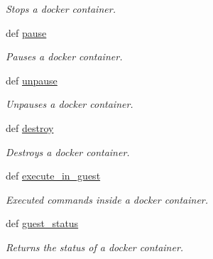 \begin{DoxyCompactItemize}
\begin{DoxyCompactList}\small\item\em Stops a docker container. \end{DoxyCompactList}\item 
\hypertarget{classhypervisor_1_1docker__driver_1_1Docker_a59333c78b7994d50b017f43e3a75d60a}{def \hyperlink{classhypervisor_1_1docker__driver_1_1Docker_a59333c78b7994d50b017f43e3a75d60a}{pause}}\label{classhypervisor_1_1docker__driver_1_1Docker_a59333c78b7994d50b017f43e3a75d60a}

\begin{DoxyCompactList}\small\item\em Pauses a docker container. \end{DoxyCompactList}\item 
\hypertarget{classhypervisor_1_1docker__driver_1_1Docker_a6bd4ee04c3dd50a06dd6dac1eb374f9b}{def \hyperlink{classhypervisor_1_1docker__driver_1_1Docker_a6bd4ee04c3dd50a06dd6dac1eb374f9b}{unpause}}\label{classhypervisor_1_1docker__driver_1_1Docker_a6bd4ee04c3dd50a06dd6dac1eb374f9b}

\begin{DoxyCompactList}\small\item\em Unpauses a docker container. \end{DoxyCompactList}\item 
\hypertarget{classhypervisor_1_1docker__driver_1_1Docker_a2ec2d8fe9b9e41e66e5939dd5440ecac}{def \hyperlink{classhypervisor_1_1docker__driver_1_1Docker_a2ec2d8fe9b9e41e66e5939dd5440ecac}{destroy}}\label{classhypervisor_1_1docker__driver_1_1Docker_a2ec2d8fe9b9e41e66e5939dd5440ecac}

\begin{DoxyCompactList}\small\item\em Destroys a docker container. \end{DoxyCompactList}\item 
\hypertarget{classhypervisor_1_1docker__driver_1_1Docker_a59d42532a812e640504eb6dad7741049}{def \hyperlink{classhypervisor_1_1docker__driver_1_1Docker_a59d42532a812e640504eb6dad7741049}{execute\-\_\-in\-\_\-guest}}\label{classhypervisor_1_1docker__driver_1_1Docker_a59d42532a812e640504eb6dad7741049}

\begin{DoxyCompactList}\small\item\em Executed commands inside a docker container. \end{DoxyCompactList}\item 
\hypertarget{classhypervisor_1_1docker__driver_1_1Docker_ab81c6c5254944c666356f27cfa82dd55}{def \hyperlink{classhypervisor_1_1docker__driver_1_1Docker_ab81c6c5254944c666356f27cfa82dd55}{guest\-\_\-status}}\label{classhypervisor_1_1docker__driver_1_1Docker_ab81c6c5254944c666356f27cfa82dd55}

\begin{DoxyCompactList}\small\item\em Returns the status of a docker container. \end{DoxyCompactList}\end{DoxyCompactItemize}


